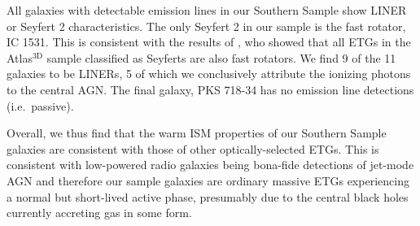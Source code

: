 \documentclass[a4paper,fleqn,usenatbib]{mnras}
\begin{document}
	All galaxies with detectable emission lines in our Southern Sample show LINER or Seyfert 2 characteristics. The only Seyfert 2 in our sample is the fast rotator, IC 1531. This is consistent with the results of \citet{Nyland2016}, who showed that all ETGs in the Atlas$^\text{3D}$ sample classified as Seyferts are also fast rotators. We find 9 of the 11 galaxies to be LINERs, 5 of which we conclusively attribute the ionizing photons to the central AGN. The final galaxy, PKS 718-34 has no emission line detections (i.e.\ passive). 

	Overall, we thus find that the warm ISM properties of our Southern Sample galaxies are consistent with those of other optically-selected ETGs. This is consistent with low-powered radio galaxies being bona-fide detections of jet-mode AGN and therefore our sample galaxies are ordinary massive ETGs experiencing a normal but short-lived active phase, presumably due to the central black holes currently accreting gas in some form. 
\end{document}
